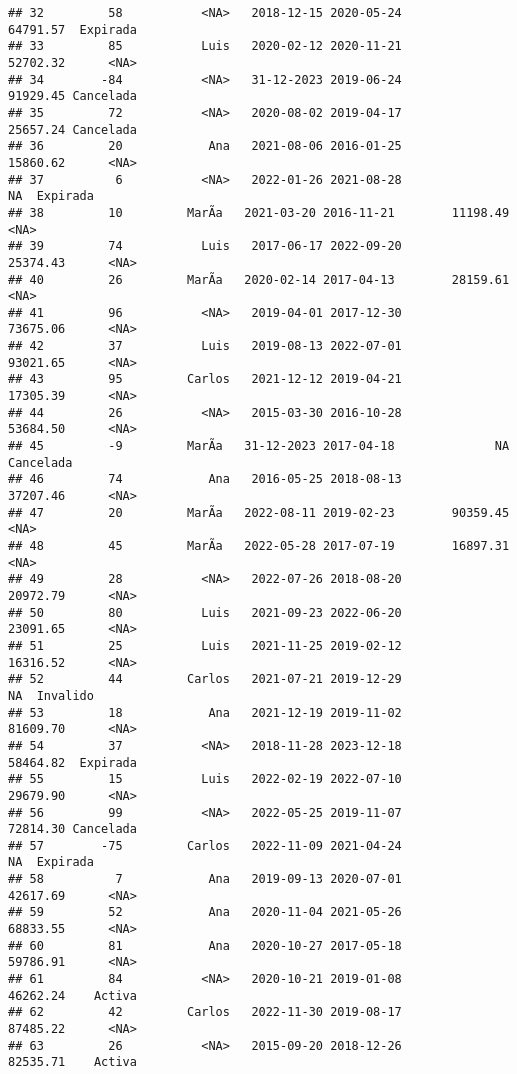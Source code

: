 \documentclass[
]{article}
\begin{document}
\begin{verbatim}
## 32         58           <NA>   2018-12-15 2020-05-24        64791.57  Expirada
## 33         85           Luis   2020-02-12 2020-11-21        52702.32      <NA>
## 34        -84           <NA>   31-12-2023 2019-06-24        91929.45 Cancelada
## 35         72           <NA>   2020-08-02 2019-04-17        25657.24 Cancelada
## 36         20            Ana   2021-08-06 2016-01-25        15860.62      <NA>
## 37          6           <NA>   2022-01-26 2021-08-28              NA  Expirada
## 38         10         MarÃ­a   2021-03-20 2016-11-21        11198.49      <NA>
## 39         74           Luis   2017-06-17 2022-09-20        25374.43      <NA>
## 40         26         MarÃ­a   2020-02-14 2017-04-13        28159.61      <NA>
## 41         96           <NA>   2019-04-01 2017-12-30        73675.06      <NA>
## 42         37           Luis   2019-08-13 2022-07-01        93021.65      <NA>
## 43         95         Carlos   2021-12-12 2019-04-21        17305.39      <NA>
## 44         26           <NA>   2015-03-30 2016-10-28        53684.50      <NA>
## 45         -9         MarÃ­a   31-12-2023 2017-04-18              NA Cancelada
## 46         74            Ana   2016-05-25 2018-08-13        37207.46      <NA>
## 47         20         MarÃ­a   2022-08-11 2019-02-23        90359.45      <NA>
## 48         45         MarÃ­a   2022-05-28 2017-07-19        16897.31      <NA>
## 49         28           <NA>   2022-07-26 2018-08-20        20972.79      <NA>
## 50         80           Luis   2021-09-23 2022-06-20        23091.65      <NA>
## 51         25           Luis   2021-11-25 2019-02-12        16316.52      <NA>
## 52         44         Carlos   2021-07-21 2019-12-29              NA  Invalido
## 53         18            Ana   2021-12-19 2019-11-02        81609.70      <NA>
## 54         37           <NA>   2018-11-28 2023-12-18        58464.82  Expirada
## 55         15           Luis   2022-02-19 2022-07-10        29679.90      <NA>
## 56         99           <NA>   2022-05-25 2019-11-07        72814.30 Cancelada
## 57        -75         Carlos   2022-11-09 2021-04-24              NA  Expirada
## 58          7            Ana   2019-09-13 2020-07-01        42617.69      <NA>
## 59         52            Ana   2020-11-04 2021-05-26        68833.55      <NA>
## 60         81            Ana   2020-10-27 2017-05-18        59786.91      <NA>
## 61         84           <NA>   2020-10-21 2019-01-08        46262.24    Activa
## 62         42         Carlos   2022-11-30 2019-08-17        87485.22      <NA>
## 63         26           <NA>   2015-09-20 2018-12-26        82535.71    Activa

\end{verbatim}
\end{document}
